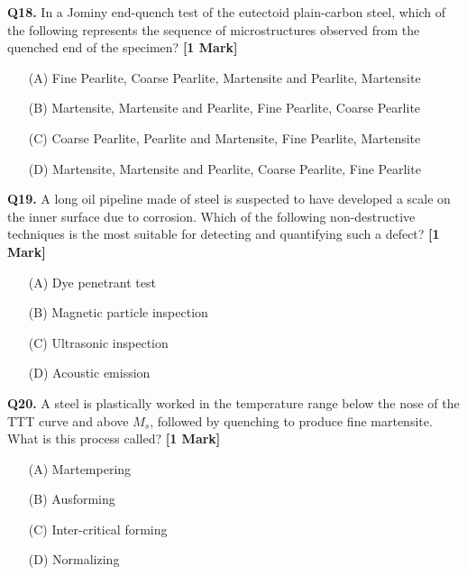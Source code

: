 \documentclass[11pt]{article}
\newcommand{\questiona}[2]{
    \noindent\textbf{Q#2.} #1 \hfill \textbf{[1 Mark]}
}
\begin{document}
\questiona{In a Jominy end-quench test of the eutectoid plain-carbon steel, which of the following represents the sequence of microstructures observed from the quenched end of the specimen?}{18}
\begin{enumerate}
    \item[(A)] Fine Pearlite, Coarse Pearlite, Martensite and Pearlite, Martensite  
    \item[(B)] Martensite, Martensite and Pearlite, Fine Pearlite, Coarse Pearlite  
    \item[(C)] Coarse Pearlite, Pearlite and Martensite, Fine Pearlite, Martensite  
    \item[(D)] Martensite, Martensite and Pearlite, Coarse Pearlite, Fine Pearlite  
\end{enumerate}
\vspace{0.5cm}

\questiona{A long oil pipeline made of steel is suspected to have developed a scale on the inner surface due to corrosion. Which of the following non-destructive techniques is the most suitable for detecting and quantifying such a defect?}{19}
\begin{enumerate}
    \item[(A)] Dye penetrant test  
    \item[(B)] Magnetic particle inspection  
    \item[(C)] Ultrasonic inspection  
    \item[(D)] Acoustic emission  
\end{enumerate}
\vspace{0.5cm}

\questiona{A steel is plastically worked in the temperature range below the nose of the TTT curve and above \(M_s\), followed by quenching to produce fine martensite. What is this process called?}{20}
\begin{enumerate}
    \item[(A)] Martempering  
    \item[(B)] Ausforming  
    \item[(C)] Inter-critical forming  
    \item[(D)] Normalizing  
\end{enumerate}
\vspace{0.5cm}
\end{document}
